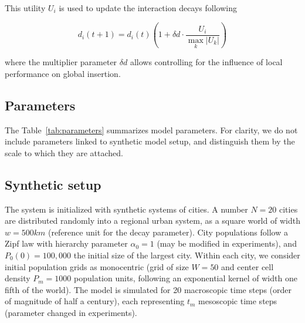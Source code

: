 \documentclass[11pt]{article}
\begin{document}
This utility $U_i$ is used to update the interaction decays following
	
\begin{equation}
\label{eq:eq7}
	d_i (t+1) = d_i (t) \left( 1 + \delta d \cdot \frac{U_i}{\max_k \left|U_k\right|} \right)
\end{equation}

where the multiplier parameter $\delta d$ allows controlling for the influence of local performance on global insertion.





\subsection{Parameters}

The Table~\ref{tab:parameters} summarizes model parameters. For clarity, we do not include parameters linked to synthetic model setup, and distinguish them by the scale to which they are attached.





\subsection{Synthetic setup}

The system is initialized with synthetic systems of cities. A number $N=20$ cities are distributed randomly into a regional urban system, as a square world of width $w=500km$ (reference unit for the decay parameter). City populations follow a Zipf law with hierarchy parameter $\alpha_0 = 1$ (may be modified in experiments), and $P_0 (0) = 100,000$ the initial size of the largest city. Within each city, we consider initial population grids as monocentric (grid of size $W=50$ and center cell density $P_m = 1000$ population units, following an exponential kernel of width one fifth of the world). %
The model is simulated for 20 macroscopic time steps (order of magnitude of half a century), each representing $t_m$ mesoscopic time steps (parameter changed in experiments).


\end{document}
